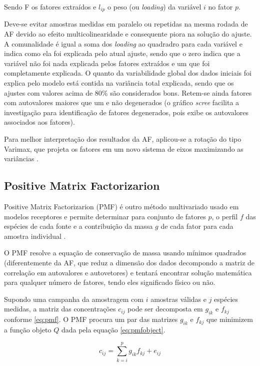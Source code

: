 Sendo F os fatores extraídos e $l_{ip}$ o peso (ou \textit{loading})
da variável $i$ no fator $p$.

Deve-se evitar amostras medidas em paralelo ou repetidas na mesma rodada de AF 
devido ao efeito multicolinearidade e consequente piora na solução do ajuste.  
A comunalidade é igual a soma dos \textit{loading} ao quadradro 
para cada variável e indica como ela foi explicada pelo atual ajuste, 
sendo que o zero indica que a variável não foi nada explicada pelos fatores 
extraídos e um que foi completamente explicada. 
O quanto da variabilidade global dos dados iniciais foi explica pelo modelo está 
contida na variância total explicada, sendo que os ajustes com valores 
acima de 80\% são considerados bons. 
Retem-se ainda fatores com autovalores maiores que um e não degenerados 
(o gráfico \textit{scree} facilita a investigação para identificação de fatores 
degenerados, pois exibe os autovalores associados aos fatores). 

Para melhor interpretação dos resultados da AF, aplicou-se a rotação do tipo 
Varimax, que projeta os fatores em um novo sistema de eixos maximizando 
as variâncias \citep{kaiser1958}.

\subsection{Positive Matrix Factorizarion}

Positive Matrix Factorizarion (PMF) é outro método multivariado usado
em modelos receptores e permite determinar para conjunto de fatores $p$, 
o perfil $f$ das espécies de cada fonte e a contribuição da massa $g$ 
de cada fator para cada amostra individual \citep{norris2014}. 

O PMF resolve a equação de conservação de massa usando mínimos 
quadrados (diferentemente da AF, que reduz a dimensão dos 
dados decompondo a matriz de correlação em autovalores e autovetores) e 
tentará encontrar solução matemática para qualquer número de fatores, tendo
eles significado físico ou não. 

Supondo uma campanha da amostragem com $i$ amostras válidas e 
$j$ espécies medidas, a matriz das concentrações $c_{ij}$ 
pode ser decomposta em $g_{ik}$ e $f_{kj}$ conforme \ref{eq:pmf}. 
O PMF procura um par das matrizes $g_{ik}$ e $f_{kj}$ que
minimizem a função objeto $Q$ dada pela equação \ref{eq:pmfobject}. 

\begin{equation}
  c_{ij} = \sum_{k=i}^p g_{ik}f_{kj} + e_{ij}
  \label{eq:pmf}
\end{equation}

